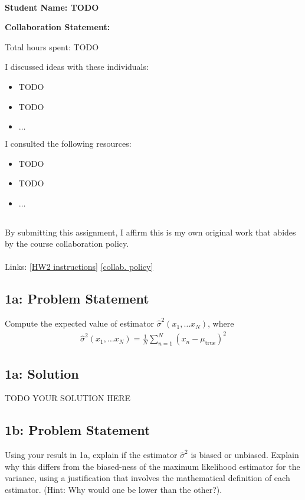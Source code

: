\documentclass[10pt]{article}
\newcommand{\officialdirections}[1]{{\color{purple} #1}}
\begin{document}
~~\\ %

{\Large{\bf Student Name: TODO}}

\Large{\bf Collaboration Statement:}

Total hours spent: TODO

I discussed ideas with these individuals:
\begin{itemize}
\item TODO
\item TODO
\item $\ldots$	
\end{itemize}

I consulted the following resources:
\begin{itemize}
\item TODO
\item TODO
\item $\ldots$	
\end{itemize}
~~\\
By submitting this assignment, I affirm this is my own original work that abides by the course collaboration policy.
~~\\
~~\\
Links: 
\href{https://www.cs.tufts.edu/cs/136/2023s/hw2.html}{[HW2 instructions]} 
\href{https://www.cs.tufts.edu/cs/136/2023s/index.html#collaboration}{[collab. policy]} 

\tableofcontents

\newpage

\officialdirections{
\subsection*{1a: Problem Statement}
Compute the expected value of estimator $\hat{\sigma}^2(x_1, \ldots x_N)$, where
\begin{align}
\hat{\sigma}^2(x_1, \ldots x_N) = \frac{1}{N} \sum_{n=1}^N (x_n - \mu_{\text{true}})^2
\end{align}
}

\subsection{1a: Solution}
TODO YOUR SOLUTION HERE

\officialdirections{
\subsection*{1b: Problem Statement}
Using your result in 1a, explain if the estimator $\hat{\sigma}^2$ is biased or unbiased. Explain why this differs from the biased-ness of the maximum likelihood estimator for the variance, using a justification that involves the mathematical definition of each estimator. (Hint: Why would one be lower than the other?).
}
\end{document}
